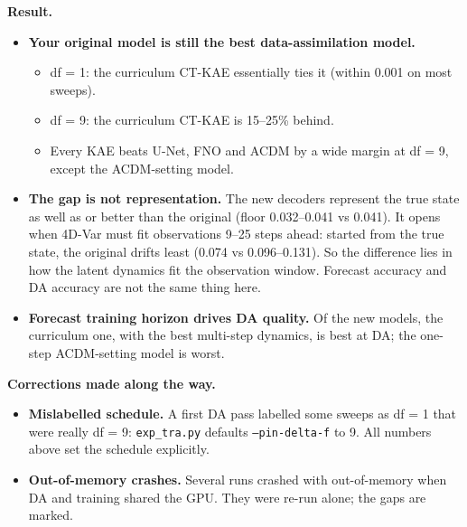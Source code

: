 \textbf{Result.}
\begin{itemize}
\item \textbf{Your original model is still the best data-assimilation model.}
  \begin{itemize}
  \item df = 1: the curriculum CT-KAE essentially ties it (within 0.001 on most sweeps).
  \item df = 9: the curriculum CT-KAE is 15--25\% behind.
  \item Every KAE beats U-Net, FNO and ACDM by a wide margin at df = 9, except the
    ACDM-setting model.
  \end{itemize}
\item \textbf{The gap is not representation.} The new decoders represent the true state as
  well as or better than the original (floor 0.032--0.041 vs 0.041). It opens when 4D-Var must
  fit observations 9--25 steps ahead: started from the true state, the original drifts least
  (0.074 vs 0.096--0.131). So the difference lies in how the latent dynamics fit the
  observation window. Forecast accuracy and DA accuracy are not the same thing here.
\item \textbf{Forecast training horizon drives DA quality.} Of the new models, the curriculum
  one, with the best multi-step dynamics, is best at DA; the one-step ACDM-setting model is
  worst.
\end{itemize}

\textbf{Corrections made along the way.}
\begin{itemize}
\item \textbf{Mislabelled schedule.} A first DA pass labelled some sweeps as df = 1 that were
  really df = 9: \texttt{exp\_tra.py} defaults \texttt{--pin-delta-f} to 9. All numbers above
  set the schedule explicitly.
\item \textbf{Out-of-memory crashes.} Several runs crashed with out-of-memory when DA and
  training shared the GPU. They were re-run alone; the gaps are marked.
\end{itemize}
